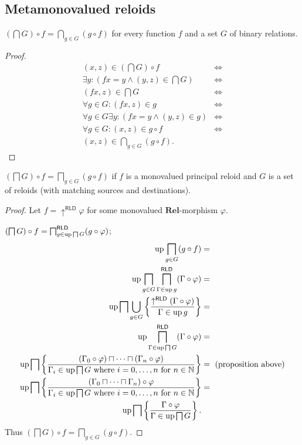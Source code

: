 \subsection{Metamonovalued reloids}
\begin{prop}
$\left(\bigcap G\right)\circ f=\bigcap_{g\in G}(g\circ f)$ for every
function $f$ and a set $G$ of binary relations.\end{prop}
\begin{proof}
~
\begin{align*}
(x,z)\in\left(\bigcap G\right)\circ f & \Leftrightarrow\\
\exists y:(fx=y\land(y,z)\in\bigcap G) & \Leftrightarrow\\
(fx,z)\in\bigcap G & \Leftrightarrow\\
\forall g\in G:(fx,z)\in g & \Leftrightarrow\\
\forall g\in G\exists y:(fx=y\land(y,z)\in g) & \Leftrightarrow\\
\forall g\in G:(x,z)\in g\circ f & \Leftrightarrow\\
(x,z)\in\bigcap_{g\in G}(g\circ f).
\end{align*}
\end{proof}
\begin{lem}
$\left(\bigsqcap G\right)\circ f=\bigsqcap_{g\in G}(g\circ f)$ if
$f$ is a monovalued principal reloid and $G$ is a set of reloids
(with matching sources and destinations).\end{lem}
\begin{proof}
Let $f=\uparrow^{\mathsf{RLD}}\varphi$ for some monovalued $\mathbf{Rel}$-morphism
$\varphi$.

$\left(\bigsqcap G\right)\circ f=\bigsqcap_{g\in\operatorname{up}\bigsqcap G}^{\mathsf{RLD}}(g\circ\varphi)$;
\begin{align*}
\operatorname{up}\bigsqcap_{g\in G}(g\circ f) & =\\
\operatorname{up}\bigsqcap_{g\in G}\bigsqcap_{\Gamma\in\operatorname{up} g}^{\mathsf{RLD}}(\Gamma\circ\varphi) & =\\
\operatorname{up}\bigsqcap\bigcup_{g\in G}\left\{ \frac{\uparrow^{\mathsf{RLD}}(\Gamma\circ\varphi)}{\Gamma\in\operatorname{up} g}\right\} & =\\
\operatorname{up}\bigsqcap_{\Gamma\in\operatorname{up}\bigsqcap G}^{\mathsf{RLD}}(\Gamma\circ\varphi) & =\\
\operatorname{up}\bigsqcap\left\{ \frac{(\Gamma_{0}\circ\varphi)\sqcap\dots\sqcap(\Gamma_{n}\circ\varphi)}{\Gamma_{i}\in\operatorname{up}\bigsqcap G\text{ where \ensuremath{i=0,\dots,n} for \ensuremath{n\in\mathbb{N}}}}\right\} & =\text{ (proposition above)}\\
\operatorname{up}\bigsqcap\left\{ \frac{(\Gamma_{0}\sqcap\dots\sqcap\Gamma_{n})\circ\varphi}{\Gamma_{i}\in\operatorname{up}\bigsqcap G\text{ where \ensuremath{i=0,\dots,n} for \ensuremath{n\in\mathbb{N}}}}\right\} & =\\
\operatorname{up}\bigsqcap\left\{ \frac{\Gamma\circ\varphi}{\Gamma\in\operatorname{up}\bigsqcap G}\right\}.
\end{align*}
Thus $\left(\bigsqcap G\right)\circ f=\bigsqcap_{g\in G}(g\circ f)$.\end{proof}
